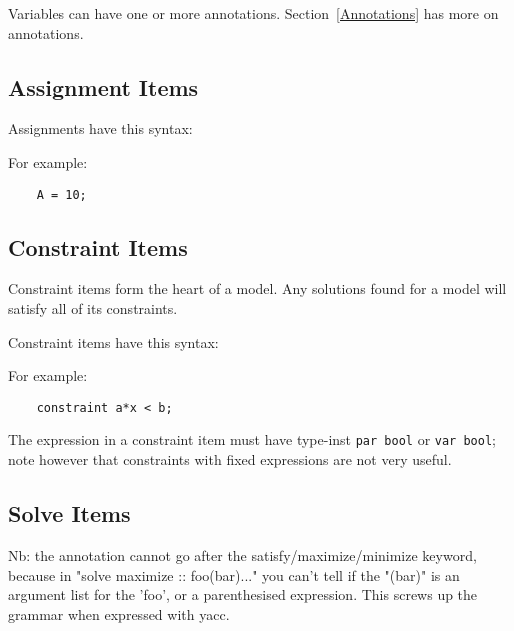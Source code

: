\documentclass[10pt]{scrartcl}
\newcommand{\pjs}[1]{\textcolor{blue}{PJS:#1}}
\begin{document}
Variables can have one or more annotations.
Section~\ref{Annotations} has more on annotations.

\subsection{Assignment Items}
     \label{Assignments}
Assignments have this syntax:
\begin{productions}
    \RuleAssignItem
\end{productions}
For example:
\begin{verbatim}
    A = 10;
\end{verbatim}


\subsection{Constraint Items}
     \label{Constraint Items}
Constraint items form the heart of a model.  Any solutions found for a model
will satisfy all of its constraints.

Constraint items have this syntax:
\begin{productions}
    \RuleConstraintItem
\end{productions}
For example:
\begin{verbatim}
    constraint a*x < b;
\end{verbatim}

The expression in a constraint item must have type-inst \texttt{par bool} or
\texttt{var bool}; note however that constraints with fixed expressions are
not very useful.

\subsection{Solve Items}
     \label{Solve Items}
{Nb: the annotation cannot go after the satisfy/maximize/minimize keyword,
because in "solve maximize :: foo(bar)..."  you can't tell if the "(bar)" is
an argument list for the 'foo', or a parenthesised expression.  This screws
up the grammar when expressed with yacc.}{}
\end{document}
